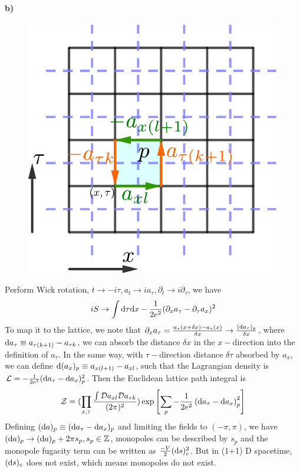 \documentclass[a4paper,11pt]{article}
\begin{document}
\paragraph{b)}
\begin{figure}
    \centering
    \includegraphics[width = 0.95\linewidth]{lattice.pdf}
    \label{lattice}
\end{figure}
Perform Wick rotation, $t \rightarrow -i\tau, a_t \rightarrow ia_{\tau}, \partial_t \rightarrow i \partial_{\tau}$, we have 
\begin{equation}
    iS \rightarrow \int {\rm d}\tau {\rm d} x -\frac{1}{2e^2} 
    (\partial_x a_{\tau} - \partial_{\tau} a_x)^2
\end{equation}
To map it to the lattice, we note that $\partial_x a_{\tau} = \frac{a_{\tau}(x+\delta x) - a_{\tau}(x)}{\delta x} \rightarrow \frac{({\rm d}a_{\tau})_p}{\delta x}$, where $ {\rm d}a_\tau \equiv a_{\tau (k+1)} - a_{\tau k} $, we can absorb the distance $\delta x$ in the $x-$direction into the definition of $a_{\tau}$. In the same way, with $\tau-$direction distance $\delta {\tau}$ absorbed by $a_x$, we can define ${\rm d} (a_x)_p \equiv a_{x(l+1)} - a_{xl}$, such that the Lagrangian density is $\mathcal{L} = -\frac{1}{2e^2} ({\rm d}a_{\tau} - {\rm d}a_x)_p^2$. Then the Euclidean lattice path integral is
\begin{equation}
    \mathcal{Z} = (\prod_{x,\tau} \frac{\int {\mathcal{D}} a_{xl} {\mathcal{D}}  a_{\tau k}}{(2\pi)^2})
    \exp \left[\sum_{p} - \frac{1}{2e^2 }
    \left(
        {\rm d}a_{\tau}-{\rm d}a_{x}
    \right)_p^2\right]
\end{equation}
Defining $({\rm d}a)_p \equiv ({\rm d}a_{\tau} - {\rm d}a_x)_p $ and limiting the fields to $(-\pi, \pi)$, we have $ ({\rm d}a)_p\rightarrow ({\rm d}a)_p + 2\pi s_p, s_p \in \mathbb{Z}$, monopoles can be described by $s_p$ and the monopole fugacity term can be written as $\frac{-V}{2} ({\rm d}s)_c^2$. But in (1+1) D spacetime, $({\rm d} s)_c$ does not exist, which means monopoles do not exist.
\end{document}
